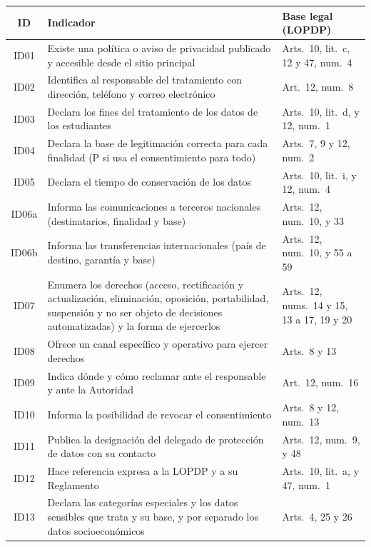 \documentclass[11pt,a4paper]{article}
\begin{document}
{\small
\renewcommand{\arraystretch}{1.2}
\begin{tabularx}{\textwidth}{|c|L|>{\raggedright\arraybackslash}p{3.8cm}|}
  \hline
  \textbf{ID} & \textbf{Indicador} & \textbf{Base legal (LOPDP)} \\ \hline
  ID01 & Existe una política o aviso de privacidad publicado y accesible desde el sitio principal & Arts.~10, lit.~c, 12 y 47, num.~4 \\ \hline
  ID02 & Identifica al responsable del tratamiento con dirección, teléfono y correo electrónico & Art.~12, num.~8 \\ \hline
  ID03 & Declara los fines del tratamiento de los datos de los estudiantes & Arts.~10, lit.~d, y 12, num.~1 \\ \hline
  ID04 & Declara la base de legitimación correcta para cada finalidad (P si usa el consentimiento para todo) & Arts.~7, 9 y 12, num.~2 \\ \hline
  ID05 & Declara el tiempo de conservación de los datos & Arts.~10, lit.~i, y 12, num.~4 \\ \hline
  ID06a & Informa las comunicaciones a terceros nacionales (destinatarios, finalidad y base) & Arts.~12, num.~10, y 33 \\ \hline
  ID06b & Informa las transferencias internacionales (país de destino, garantía y base) & Arts.~12, num.~10, y 55 a 59 \\ \hline
  ID07 & Enumera los derechos (acceso, rectificación y actualización, eliminación, oposición, portabilidad, suspensión y no ser objeto de decisiones automatizadas) y la forma de ejercerlos & Arts.~12, nums.~14 y 15, 13 a 17, 19 y 20 \\ \hline
  ID08 & Ofrece un canal específico y operativo para ejercer derechos & Arts.~8 y 13 \\ \hline
  ID09 & Indica dónde y cómo reclamar ante el responsable y ante la Autoridad & Art.~12, num.~16 \\ \hline
  ID10 & Informa la posibilidad de revocar el consentimiento & Arts.~8 y 12, num.~13 \\ \hline
  ID11 & Publica la designación del delegado de protección de datos con su contacto & Arts.~12, num.~9, y 48 \\ \hline
  ID12 & Hace referencia expresa a la LOPDP y a su Reglamento & Arts.~10, lit.~a, y 47, num.~1 \\ \hline
  ID13 & Declara las categorías especiales y los datos sensibles que trata y su base, y por separado los datos socioeconómicos & Arts.~4, 25 y 26 \\ \hline

\end{tabularx}}
\end{document}
